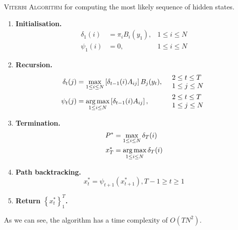 \begin{algorithm}
	\caption{\textsc{Viterbi Algorithm} for computing the most likely sequence of hidden states.}
	\label{alg:viterbi}
	\begin{enumerate}
		\item
			\textbf{Initialisation.}
			\begin{align*}
				\delta_1(i) & = \pi_i B_i(y_1), & 1 \leq i \leq N \\
				\psi_1(i) & = 0, & 1 \leq i \leq N
			\end{align*}
		\item
			\textbf{Recursion.}
			\begin{align*}
				\delta_t(j) & = \max_{1 \leq i \leq N} \left[ \delta_{t - 1}(i) A_{ij} \right] B_j(y_t), &
				\begin{array}{lr}
					2 \leq t \leq T\\
					1 \leq j \leq N
				\end{array}\\
				\psi_t(j) & = \operatorname*{arg\,max}_{1 \leq i \leq N} \left[ \delta_{t - 1}(i) A_{ij} \right], &
				\begin{array}{lr}
					2 \leq t \leq T\\
					1 \leq j \leq N
				\end{array}
			\end{align*}
		\item
			\textbf{Termination.}
			\begin{align*}
				P^\ast & = \max_{1 \leq i \leq N} \delta_T(i)\\
				x_T^\ast & = \operatorname*{arg\,max}_{1 \leq i \leq N} \delta_T(i)
			\end{align*}
		\item
			\textbf{Path backtracking.}
			\begin{equation*}
				x_t^\ast = \psi_{t + 1}\left(x_{t + 1}^\ast \right),  T - 1 \geq t \geq 1
			\end{equation*}
		\item
			\textbf{Return $\left\{x_t^\ast \right\}_1^T$.}
	\end{enumerate}
\end{algorithm}
As we can see, the algorithm has a time complexity of $O(TN^2)$.

